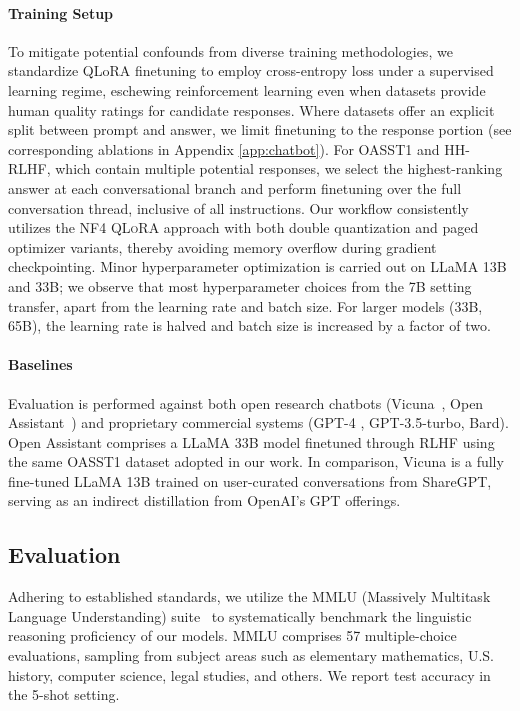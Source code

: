 \paragraph{Training Setup} To mitigate potential confounds from diverse training methodologies, we standardize QLoRA finetuning to employ cross-entropy loss under a supervised learning regime, eschewing reinforcement learning even when datasets provide human quality ratings for candidate responses. Where datasets offer an explicit split between prompt and answer, we limit finetuning to the response portion (see corresponding ablations in Appendix \ref{app:chatbot}). For OASST1 and HH-RLHF, which contain multiple potential responses, we select the highest-ranking answer at each conversational branch and perform finetuning over the full conversation thread, inclusive of all instructions. Our workflow consistently utilizes the NF4 \textsc{QLoRA} approach with both double quantization and paged optimizer variants, thereby avoiding memory overflow during gradient checkpointing. Minor hyperparameter optimization is carried out on LLaMA 13B and 33B; we observe that most hyperparameter choices from the 7B setting transfer, apart from the learning rate and batch size. For larger models (33B, 65B), the learning rate is halved and batch size is increased by a factor of two.

\paragraph{Baselines} Evaluation is performed against both open research chatbots (Vicuna~\citep{vicuna2023}, Open Assistant~\citep{kopf2023openassistant}) and proprietary commercial systems (GPT-4 \citep{openai2023gpt}, GPT-3.5-turbo, Bard). Open Assistant comprises a LLaMA 33B model finetuned through RLHF using the same OASST1 dataset adopted in our work. In comparison, Vicuna is a fully fine-tuned LLaMA 13B trained on user-curated conversations from ShareGPT, serving as an indirect distillation from OpenAI's GPT offerings.

\subsection{Evaluation}

Adhering to established standards, we utilize the MMLU (Massively Multitask Language Understanding) suite~\citep{hendrycksmeasuring} to systematically benchmark the linguistic reasoning proficiency of our models. MMLU comprises 57 multiple-choice evaluations, sampling from subject areas such as elementary mathematics, U.S. history, computer science, legal studies, and others. We report test accuracy in the 5-shot setting.

